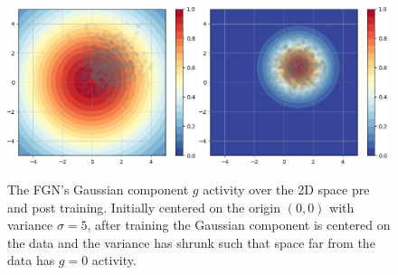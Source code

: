 \documentclass[12pt,oneside]{CUNY_PhD}
\begin{document}
\begin{figure}[!b]
    \centering
    \includegraphics[width=0.49\textwidth ]{images/2D-single-neuron/2d-easy-initialg-cropped.png}
    \includegraphics[width=0.49\textwidth]{images/2D-single-neuron/2d-easy-trainedg-cropped.png}
    \caption{The FGN's Gaussian component $g$ activity over the 2D space pre and post training. Initially centered on the origin $(0,0)$ with variance $\sigma=5$, after training the Gaussian component is centered on the data and the variance has shrunk such that space far from the data has $g=0$ activity.}
    \label{fig:single-fgn-2}
\end{figure}\\
\end{document}
